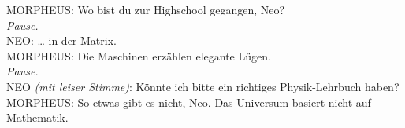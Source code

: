 \begin{playdialog}
MORPHEUS: Wo bist du zur Highschool gegangen, Neo?\\

\emph{Pause.}\\

NEO: … in der Matrix.\\

MORPHEUS: Die Maschinen erzählen elegante Lügen.\\

\emph{Pause.}\\

NEO \emph{(mit leiser Stimme)}: Könnte ich bitte ein richtiges Physik-Lehrbuch haben?\\

MORPHEUS: So etwas gibt es nicht, Neo. Das Universum basiert nicht auf Mathematik.\\

\end{playdialog}

